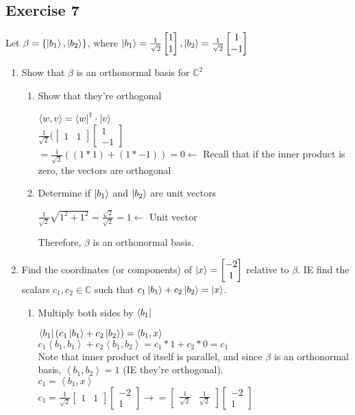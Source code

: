 \documentclass[12pt]{article}
\theoremstyle{plain}
\theoremstyle{nonumberplain}
\theoremstyle{plain}
\theoremstyle{nonumberplain}
\newcommand\1{{\bf 1}}
\newcommand{\bmat}[1]{\begin{bmatrix*} #1 \end{bmatrix*}} %
\newcommand{\C}{\mathbb{C}} %
\newcommand{\<}{\left\langle}
\renewcommand{\>}{\right\rangle}
\newcommand{\inp}[2]{\left\langle#1, #2\right\rangle} %
\begin{document}
\subsection{Exercise 7}
Let $\beta=\lbrace\ket{b_1},\ket{b_2}\rbrace$, where $\ket{b_1}=\frac{1}{\sqrt{2}}\bmat{1 \\ 1}, \ket{b_2}=\frac{1}{\sqrt{2}}\bmat{1 \\ -1}$
\begin{enumerate}[label=(\alph*)]
	\item Show that $\beta$ is an orthonormal basis for $\C^2$ \\
	\begin{enumerate}[label=(\roman*)]
		\item Show that they're orthogonal
		\begin{center}
		$\inp{w}{v}=\bra{w}^\dagger\cdot\ket{v}$ \\
		$\frac{1}{\sqrt{2}}(\bmat{1 & 1}\bmat{1 \\ -1}$ \\
		$=\frac{1}{\sqrt{2}}((1*1)+(1*-1))=0\longleftarrow$ Recall that if the inner product is zero, the 					vectors are orthogonal
		\end{center}
		\item Determine if $\ket{b_1}$ and $\ket{b_2}$ are unit vectors
		\begin{center}
		\indent $\frac{1}{\sqrt{2}}\sqrt{1^2+1^2}=\frac{\sqrt{2}}{\sqrt{2}}=1\longleftarrow$ Unit vector
		\end{center}
		Therefore, $\beta$ is an orthonormal basis.
	\end{enumerate}
	\item Find the coordinates (or components) of $\ket{x}=\bmat{-2 \\ 1}$ relative to $\beta$. IE find the 			scalars $c_1, c_2 \in \C$ such that $c_1\ket{b_1}+c_2\ket{b_2}=\ket{x}$.
	\begin{enumerate}[label=(\roman*)]
		\item Multiply both sides by $\bra{b_1}$
		\begin{center}
		$\bra{b_1}(c_1\ket{b_1}+c_2\ket{b_2})=\inp{b_1}{x}$ \\
		$c_1\inp{b_1}{b_1}+c_2\inp{b_1}{b_2} = c_1*1+c_2*0=c_1$ \\ 
		Note that inner product of itself is parallel, and since $\beta$ is an orthonormal basis, $\inp{b_1}{b_2}			=1$ (IE they're orthogonal). \\
		$c_1=\inp{b_1}{x}$ \\
		$c_1=\frac{1}{\sqrt{2}}\bmat{1 & 1}\bmat{-2 \\ 1}\longrightarrow =\bmat{\frac{1}{\sqrt{2}} & \frac{1}				{\sqrt{2}}}\bmat{-2 \\ 1}$ \\

\end{center}
\end{enumerate}
\end{enumerate}
\end{document}
